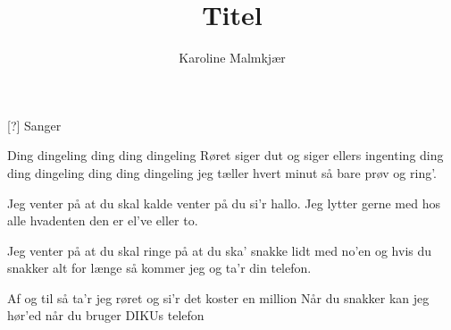 \documentclass[a4paper,11pt]{article}
\title{Titel}
\author{Karoline Malmkjær}
\begin{document}
\maketitle

\begin{roles}
[?] Sanger
\end{roles}

\begin{song}
Ding dingeling ding ding dingeling
Røret siger dut og siger ellers ingenting
ding ding dingeling ding ding dingeling
jeg tæller hvert minut så bare prøv og ring'.

Jeg venter på at du skal kalde
venter på du si'r hallo.
Jeg lytter gerne med hos alle
hvadenten den er el've eller to.

Jeg venter på at du skal ringe
på at du ska' snakke lidt med no'en
og hvis du snakker alt for længe
så kommer jeg og ta'r din telefon.

Af og til så ta'r jeg røret 
og si'r det koster en million 
Når du snakker kan jeg hør'ed
når du bruger DIKUs telefon

\end{song}
\end{document}
